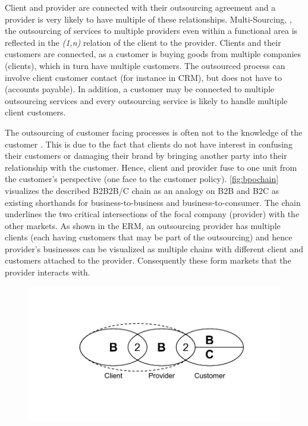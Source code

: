 	Client and provider are connected with their outsourcing agreement and a provider is very likely to have multiple of these relationships. Multi-Sourcing, \ie, the outsourcing of services to multiple providers even within a functional area is reflected in the \textit{(1,n)} relation of the client to the provider. Clients and their customers are connected, as a customer is buying goods from multiple companies (clients), which in turn have multiple customers. The outsourced process can involve client customer contact (for instance in CRM), but does not have to (accounts payable). In addition, a customer may be connected to multiple outsourcing services and every outsourcing service is likely to handle multiple client customers. 
	
	The outsourcing of customer facing processes is often not to the knowledge of the customer . This is due to the fact that clients do not have interest in confusing their customers or damaging their brand by bringing another party into their relationship with the customer. Hence, client and provider fuse to one unit from the customer's perspective (one face to the customer policy). \Fig \ref{fig:bpochain} visualizes the described B2B2B/C chain as an analogy on B2B and B2C as existing shorthands for business-to-business and business-to-consumer. The chain underlines the two critical intersections of the focal company (provider) with the other markets. As shown in the ERM, an outsourcing provider has multiple clients (each having customers that may be part of the outsourcing) and hence provider's businesses can be visualized as multiple chains with different client and customers attached to the provider. Consequently these form markets that the provider interacts with.
	
		\begin{figure}[caption={BPO B2B2B/C Chain}, label={fig:bpochain}]
	{	\includegraphics[width=.8\textwidth]{figures/bpochain.pdf}}
	\end{figure}

